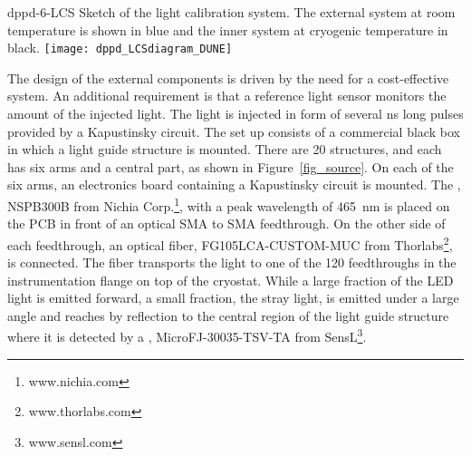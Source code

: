 
\begin{dunefigure}{dppd-6-LCS}
{Sketch of the    light calibration system. The external system at room temperature is shown in blue and the inner system at cryogenic temperature in black.}
\texttt{[image: dppd\_LCSdiagram\_DUNE]}
\end{dunefigure}


The design of the external components is driven by the need for a cost-effective system. An additional requirement is that a reference light sensor monitors the amount of the injected light. The light is injected in form of several \si{\ns} long pulses provided by a Kapustinsky circuit. The set up consists of a commercial black box in which a light guide structure is mounted. There are \num{20} structures, and each has six arms and a central part, as shown in Figure~\ref{fig_source}. On each of the six arms, an electronics board containing a Kapustinsky circuit is mounted. The , NSPB300B from Nichia Corp.\footnote{www.nichia.com}, with a peak wavelength of \SI{465}{nm} is placed  on the PCB in front of an optical SMA to SMA feedthrough. On the other side of each feedthrough, an optical fiber, FG105LCA-CUSTOM-MUC from Thorlabs\footnote{www.thorlabs.com}, is connected. The fiber transports the light to one of the \num{120} feedthroughs in the instrumentation flange on top of the cryostat. While a large fraction of the LED light is emitted forward, a small fraction, the stray light, is emitted under a large angle and reaches by reflection to the central region of the light guide structure where it is detected by a , MicroFJ-30035-TSV-TA from SensL\footnote{www.sensl.com}.




